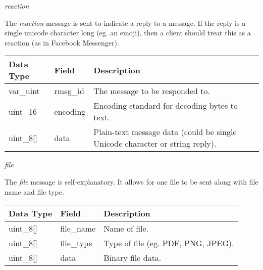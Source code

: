 \documentclass{article}
\begin{document}
\newpage

\begin{center}
    \large \textit{reaction}
\end{center}
The \textit{reaction} message is sent to indicate a reply to a message. If the reply is a single unicode character long (eg. an emoji), then a client should treat this as a reaction (as in Facebook Messenger).
\begin{table}[H]
\centering
\begin{tabular}{|p{1.3cm}|p{2.5cm}|p{6cm}|}
\hline
\rowcolor{tblgrey} 
Data Type       & Field           & Description                                               \\ \hline
var\_uint       & rmsg\_id         & The message to be responded to.                           \\ \hline
uint\_16        & encoding        & Encoding standard for decoding bytes to text.      \\ \hline
uint\_8[\hspace{0.05cm}] & data            & Plain-text message data (could be single Unicode character or string reply).      \\ \hline
\end{tabular}
\end{table}

\begin{center}
    \large \textit{file}
\end{center}
The \textit{file} message is self-explanatory. It allows for one file to be sent along with file name and file type.
\begin{table}[H]
\centering
\begin{tabular}{|p{1.3cm}|p{2.5cm}|p{6cm}|}
\hline
\rowcolor{tblgrey} 
Data Type       & Field           & Description                                               \\ \hline
uint\_8[\hspace{0.05cm}] & file\_name      & Name of file.                                             \\ \hline
uint\_8[\hspace{0.05cm}] & file\_type      & Type of file (eg. PDF, PNG, JPEG).                        \\ \hline
uint\_8[\hspace{0.05cm}] & data            & Binary file data.                                         \\ \hline
\end{tabular}
\end{table}
\end{document}
